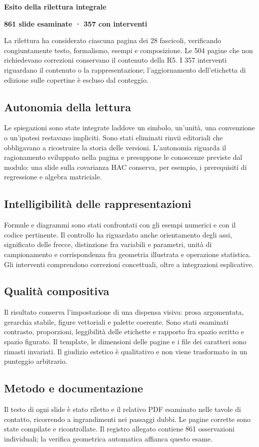 \documentclass[11pt,a4paper]{article}
\newcommand{\titolo}[1]{{\color{Navy}\LARGE\bfseries #1\par}\vspace{4pt}{\color{Teal}\hrule height 1.4pt}\vspace{12pt}}
\begin{document}
\titolo{Esito della rilettura integrale}
{\Large\color{Teal}\textbf{861 slide esaminate · 357 con interventi}}

La rilettura ha considerato ciascuna pagina dei 28 fascicoli, verificando congiuntamente testo, formalismo, esempi e composizione. Le 504 pagine che non richiedevano correzioni conservano il contenuto della R5. I 357 interventi riguardano il contenuto o la rappresentazione; l’aggiornamento dell’etichetta di edizione sulle copertine è escluso dal conteggio.

\subsection*{Autonomia della lettura}
Le spiegazioni sono state integrate laddove un simbolo, un’unità, una convenzione o un’ipotesi restavano impliciti. Sono stati eliminati rinvii editoriali che obbligavano a ricostruire la storia delle versioni. L’autonomia riguarda il ragionamento sviluppato nella pagina e presuppone le conoscenze previste dal modulo: una slide sulla covarianza HAC conserva, per esempio, i prerequisiti di regressione e algebra matriciale.

\subsection*{Intelligibilità delle rappresentazioni}
Formule e diagrammi sono stati confrontati con gli esempi numerici e con il codice pertinente. Il controllo ha riguardato anche orientamento degli assi, significato delle frecce, distinzione fra variabili e parametri, unità di campionamento e corrispondenza fra geometria illustrata e operazione statistica. Gli interventi comprendono correzioni concettuali, oltre a integrazioni esplicative.

\subsection*{Qualità compositiva}
Il risultato conserva l’impostazione di una dispensa visiva: prosa argomentata, gerarchia stabile, figure vettoriali e palette coerente. Sono stati esaminati contrasto, proporzioni, leggibilità delle etichette e rapporto fra spazio scritto e spazio figurato. Il template, le dimensioni delle pagine e i file dei caratteri sono rimasti invariati. Il giudizio estetico è qualitativo e non viene trasformato in un punteggio arbitrario.

\subsection*{Metodo e documentazione}
Il testo di ogni slide è stato riletto e il relativo PDF esaminato nelle tavole di contatto, ricorrendo a ingrandimenti nei passaggi dubbi. Le pagine corrette sono state compilate e ricontrollate. Il registro allegato contiene 861 osservazioni individuali; la verifica geometrica automatica affianca questo esame.
\end{document}
